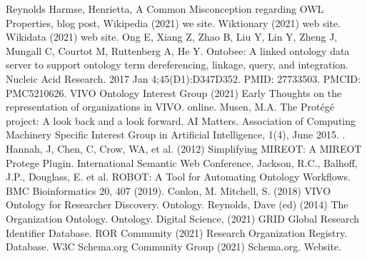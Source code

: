 \documentclass[letterpaper,10pt,english]{sphinxmanual}
\begin{document}
\begin{sphinxthebibliography}{Reynolds}
\sphinxAtStartPar
Harmse, Henrietta, A Common Misconception regarding OWL Properties,
blog post,
\sphinxAtStartPar
Wikipedia (2021) we site.  
\sphinxAtStartPar
Wiktionary (2021) web site. 
\sphinxAtStartPar
Wikidata (2021) web site. 
\sphinxAtStartPar
Ong E, Xiang Z, Zhao B, Liu Y, Lin Y, Zheng J, Mungall C, Courtot M,
Ruttenberg A, He Y. Ontobee: A linked ontology data server to support ontology term
dereferencing, linkage, query, and integration. Nucleic Acid Research. 2017
Jan 4;45(D1):D347\sphinxhyphen{}D352. PMID: 27733503. PMCID: PMC5210626.
\sphinxAtStartPar
VIVO Ontology Interest Group (2021) Early Thoughts on the representation
of organizations in VIVO.  on\sphinxhyphen{}line.  
\sphinxAtStartPar
Musen, M.A. The Protégé project: A look back and a look forward. AI
Matters.
Association of Computing Machinery Specific Interest Group in Artificial Intelligence,
1(4), June 2015. .
\sphinxAtStartPar
Hannah, J, Chen, C, Crow, WA, et al. (2012) Simplifying MIREOT: A
MIREOT Protege Plugin. International Semantic Web Conference,
\sphinxAtStartPar
Jackson, R.C., Balhoff, J.P., Douglass, E. et al. ROBOT: A Tool
for Automating Ontology Workflows. BMC Bioinformatics 20, 407 (2019).
\sphinxAtStartPar
Conlon, M. Mitchell, S. (2018) VIVO Ontology for Researcher Discovery.
Ontology.
\sphinxAtStartPar
Reynolds, Dave (ed) (2014) The Organization Ontology.
Ontology.  
\sphinxAtStartPar
Digital Science, (2021) GRID Global Research Identifier Database.
\sphinxAtStartPar
ROR Community (2021) Research Organization Registry. Database.
\sphinxAtStartPar
W3C Schema.org Community Group (2021) Schema.org. Website.
\end{sphinxthebibliography}



\renewcommand{\indexname}{Index}
\printindex
\end{document}
